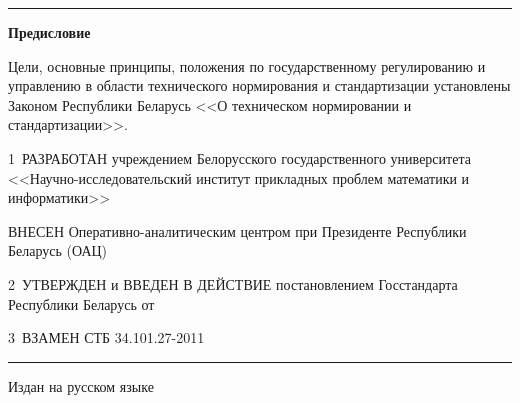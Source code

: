 \vskip0.5mm

\hrule 

\rule{0pt}{5mm}
	 
\centerline{\bf Предисловие} 

Цели, основные принципы, положения по государственному регулированию и 
управлению в области технического нормирования и стандартизации 
установлены Законом Республики Беларусь <<О техническом нормировании и 
стандартизации>>.  

\vskip0.2cm

1~РАЗРАБОТАН учреждением Белорусского государственного университета
<<Науч\-но-исследовательский институт прикладных проблем математики и информатики>>

ВНЕСЕН Оперативно-аналитическим центром при Президенте Республики Беларусь (ОАЦ)

2~УТВЕРЖДЕН и ВВЕДЕН В ДЕЙСТВИЕ постановлением Госстандарта Республики 
Беларусь от $\phantom{\text{25 ноября 2011 г.}}$ \No~$\phantom{\text{83}}$ 

3~ВЗАМЕН СТБ 34.101.27-2011

\vfill

\hrule
\vskip1mm
Издан на русском языке

\pagebreak
